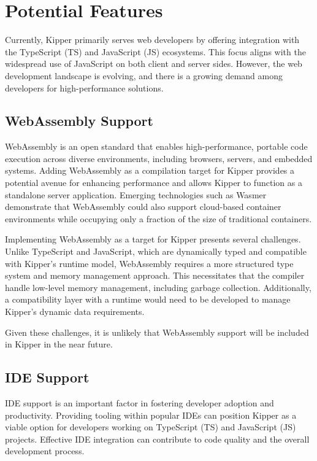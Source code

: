 \section{Potential Features}
\label{sec:future}

Currently, Kipper primarily serves web developers by offering integration with the TypeScript (TS) and JavaScript (JS) ecosystems. This focus aligns with the widespread use of JavaScript on both client and server sides. However, the web development landscape is evolving, and there is a growing demand among developers for high-performance solutions.

\subsection{WebAssembly Support}

WebAssembly is an open standard that enables high-performance, portable code execution across diverse environments, including browsers, servers, and embedded systems. Adding WebAssembly as a compilation target for Kipper provides a potential avenue for enhancing performance and allows Kipper to function as a standalone server application. Emerging technologies such as Wasmer demonstrate that WebAssembly could also support cloud-based container environments while occupying only a fraction of the size of traditional containers.

Implementing WebAssembly as a target for Kipper presents several challenges. Unlike TypeScript and JavaScript, which are dynamically typed and compatible with Kipper’s runtime model, WebAssembly requires a more structured type system and memory management approach. This necessitates that the compiler handle low-level memory management, including garbage collection. Additionally, a compatibility layer with a runtime would need to be developed to manage Kipper’s dynamic data requirements.

Given these challenges, it is unlikely that WebAssembly support will be included in Kipper in the near future.

\subsection{IDE Support}

IDE support is an important factor in fostering developer adoption and productivity. Providing tooling within popular IDEs can position Kipper as a viable option for developers working on TypeScript (TS) and JavaScript (JS) projects. Effective IDE integration can contribute to code quality and the overall development process.

